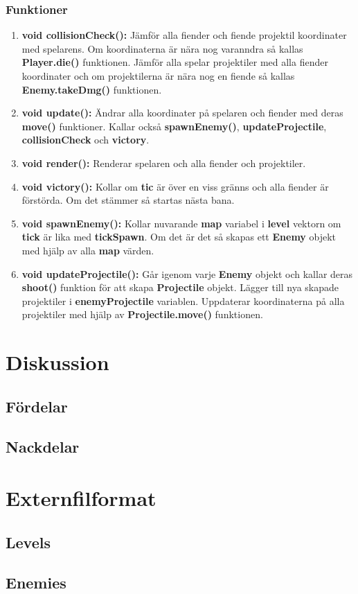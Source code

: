 \documentclass{TDP005mall}
\begin{document}
 \subsubsection*{Funktioner}
 \begin{enumerate}
   \item \textbf{void collisionCheck(): } Jämför alla fiender och fiende projektil koordinater med spelarens.
                                          Om koordinaterna är nära nog varanndra så kallas \textbf{Player.die()} funktionen.
                                          Jämför alla spelar projektiler med alla fiender koordinater och om projektilerna är nära nog en fiende så kallas \textbf{Enemy.takeDmg()} funktionen.
  \item \textbf{void update(): } Ändrar alla koordinater på spelaren och fiender med deras \textbf{move()} funktioner.
                                Kallar också \textbf{spawnEnemy()}, \textbf{updateProjectile}, \textbf{collisionCheck} och \textbf{victory}.
  \item \textbf{void render(): } Renderar spelaren och alla fiender och projektiler.
  \item \textbf{void victory(): } Kollar om \textbf{tic} är över en viss gränns och alla fiender är förstörda.
                                  Om det stämmer så startas nästa bana.
  \item \textbf{void spawnEnemy(): } Kollar nuvarande \textbf{map} variabel i \textbf{level} vektorn om \textbf{tick} är lika med \textbf{tickSpawn}.
                                      Om det är det så skapas ett \textbf{Enemy} objekt med hjälp av alla \textbf{map} värden.

  \item \textbf{void updateProjectile(): } Går igenom varje \textbf{Enemy} objekt och kallar deras \textbf{shoot()} funktion för att skapa \textbf{Projectile} objekt.
                                           Lägger till nya skapade projektiler i \textbf{enemyProjectile} variablen.
                                           Uppdaterar koordinaterna på alla projektiler med hjälp av \textbf{Projectile.move()} funktionen.

  \end{enumerate}
\section{Diskussion}

\subsection{Fördelar}
\subsection{Nackdelar}
\section{Externfilformat}
\subsection{Levels}
\subsection{Enemies}
\end{document}
